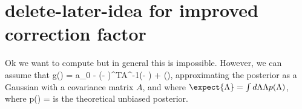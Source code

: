 \section{delete-later-idea for improved correction factor}


Ok we want to compute 
\beq
{}
\eeq
but in general this is impossible. However, we can assume that 
\beq
g(\Lambda) = a_0 - (\Lambda - \expect{\Lambda})^{T}A^{-1}(\Lambda - \expect{\Lambda}) + \delta(\Lambda),
\eeq
approximating the posterior as a Gaussian with a covariance matrix $A$, and where $\expect{\Lambda} = \int d\Lambda \Lambda p(\Lambda)$, where 
\beq
p(\Lambda) = 
\eeq
is the theoretical unbiased posterior.

